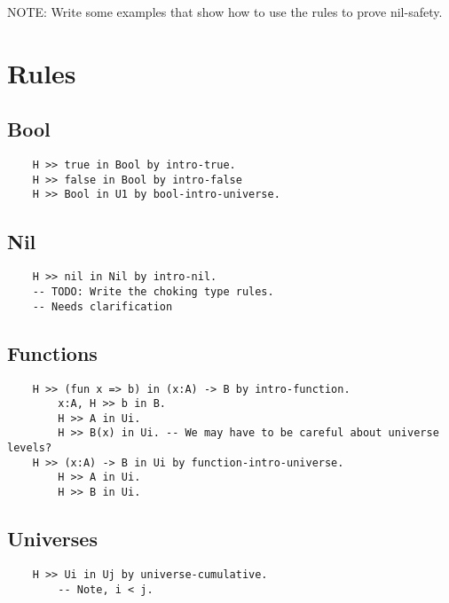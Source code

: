 \documentclass{article}
\begin{document}
{\color{red} NOTE:} Write some examples that show how to use the rules to prove nil-safety.

\section{Rules}
\subsection{Bool}
\begin{verbatim}
    H >> true in Bool by intro-true.
    H >> false in Bool by intro-false
    H >> Bool in U1 by bool-intro-universe.
\end{verbatim}
\subsection{Nil}
\begin{verbatim}
    H >> nil in Nil by intro-nil.
    -- TODO: Write the choking type rules.
    -- Needs clarification
\end{verbatim}
\subsection{Functions}
\begin{verbatim}
    H >> (fun x => b) in (x:A) -> B by intro-function.
        x:A, H >> b in B.
        H >> A in Ui.
        H >> B(x) in Ui. -- We may have to be careful about universe levels?
    H >> (x:A) -> B in Ui by function-intro-universe.
        H >> A in Ui.
        H >> B in Ui.
\end{verbatim}
\subsection{Universes}
\begin{verbatim}
    H >> Ui in Uj by universe-cumulative.
        -- Note, i < j.
\end{verbatim}
\end{document}
